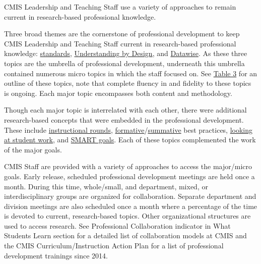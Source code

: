 \documentclass{report}
\begin{document}
\begin{findings}
CMIS Leadership and Teaching Staff use a variety of approaches to remain current in research-based professional knowledge.


Three broad themes are the cornerstone of professional development to keep CMIS Leadership and Teaching Staff current in research-based professional knowledge: \href{https://drive.google.com/drive/folders/0B71_pYxcTLo-NGJ4N0RQWXRTNE0?usp=sharing}{standards}, \href{https://docs.google.com/a/cmis.ac.th/document/d/1kL1VjwfuMMa7NaWmwUrEah1BM-jJRmLAd4VJzR3HoPs/edit?usp=sharing}{Understanding by Design}, and \href{https://docs.google.com/a/cmis.ac.th/presentation/d/1omzyjfwf5fazGCSuvw7dDQn4eqhpOIaldeLXY7-6PYQ/edit?usp=sharing}{Datawise}. As these three topics are the umbrella of professional development, underneath this umbrella contained numerous micro topics in which the staff focused on. See \href{https://docs.google.com/a/cmis.ac.th/document/d/1Xi1oHSwcvMUAaFtHW9SU3m1QJpIRRrmdphVHokoJsI8/edit?usp=sharing}{Table 3} for an outline of these topics, note that complete fluency in and fidelity to these topics is ongoing. Each major topic encompasses both content and methodology. 

Though each major topic is interrelated with each other, there were additional research-based concepts that were embedded in the professional development. These include \href{https://drive.google.com/drive/folders/0ByVFfrm0zfolQ3FRNWNSVmpCUUk?usp=sharing}{instructional rounds}, \href{https://drive.google.com/drive/folders/0ByVFfrm0zfolaFNZMDVFZnFLazA?usp=sharing}{formative}/\href{https://drive.google.com/drive/folders/0ByVFfrm0zfolczUtZFkzUldXQnM?usp=sharing}{summative} best practices, \href{https://drive.google.com/drive/folders/0ByVFfrm0zfolWW5aWGZOUjVJTm8?usp=sharing}{looking at student work}, and \href{https://drive.google.com/drive/folders/0ByVFfrm0zfolWFNfWGRuWDlxUDQ?usp=sharing}{SMART goals}. Each of these topics complemented the work of the major goals. 

CMIS Staff are provided with a variety of approaches to access the major/micro goals. Early release, scheduled professional development meetings are held once a month. During this time, whole/small, and department, mixed, or interdisciplinary groups are organized for collaboration. Separate department and division meetings are also scheduled once a month where a percentage of the time is devoted to current, research-based topics. Other organizational structures are used to access research. See Professional Collaboration indicator in What Students Learn section for a detailed list of collaboration models at CMIS and the CMIS Curriculum/Instruction Action Plan for a list of professional development trainings since 2014. 
 

\end{findings}
\end{document}

